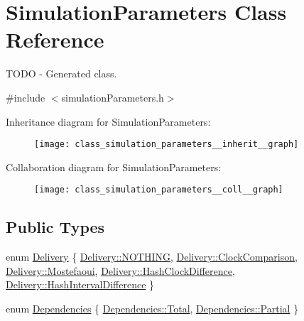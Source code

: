 \hypertarget{class_simulation_parameters}{}\section{Simulation\+Parameters Class Reference}
\label{class_simulation_parameters}


T\+O\+DO -\/ Generated class.  




{\ttfamily \#include $<$simulation\+Parameters.\+h$>$}



Inheritance diagram for Simulation\+Parameters\+:\nopagebreak
\begin{figure}[H]
\begin{center}
\leavevmode
\texttt{[image: class\_simulation\_parameters\_\_inherit\_\_graph]}
\end{center}
\end{figure}


Collaboration diagram for Simulation\+Parameters\+:\nopagebreak
\begin{figure}[H]
\begin{center}
\leavevmode
\texttt{[image: class\_simulation\_parameters\_\_coll\_\_graph]}
\end{center}
\end{figure}
\subsection*{Public Types}
\begin{DoxyCompactItemize}
\item 
enum \hyperlink{class_simulation_parameters_ae08444273809241f502aa422205f7307}{Delivery} \{ \newline
\hyperlink{class_simulation_parameters_ae08444273809241f502aa422205f7307a8697250efc73639dd2a6e7da243ac68b}{Delivery\+::\+N\+O\+T\+H\+I\+NG}, 
\hyperlink{class_simulation_parameters_ae08444273809241f502aa422205f7307a3ccf7e50009c796055e4814c7219f2df}{Delivery\+::\+Clock\+Comparison}, 
\hyperlink{class_simulation_parameters_ae08444273809241f502aa422205f7307a59feb63389b0898ec47a4ab58d1be6f6}{Delivery\+::\+Mostefaoui}, 
\hyperlink{class_simulation_parameters_ae08444273809241f502aa422205f7307a9a46ad9fb926b8b78ba9395f96aa6af0}{Delivery\+::\+Hash\+Clock\+Difference}, 
\newline
\hyperlink{class_simulation_parameters_ae08444273809241f502aa422205f7307ae3d02f7a43cb7e3e7d667a67f84c3e32}{Delivery\+::\+Hash\+Interval\+Difference}
 \}
\item 
enum \hyperlink{class_simulation_parameters_afb3b6aaecd4b19ef1991c870c8402dff}{Dependencies} \{ \hyperlink{class_simulation_parameters_afb3b6aaecd4b19ef1991c870c8402dffa96b0141273eabab320119c467cdcaf17}{Dependencies\+::\+Total}, 
\hyperlink{class_simulation_parameters_afb3b6aaecd4b19ef1991c870c8402dffa44ffd38a6dea695cbe2b34efdcc6cf27}{Dependencies\+::\+Partial}
 \}
\end{DoxyCompactItemize}
